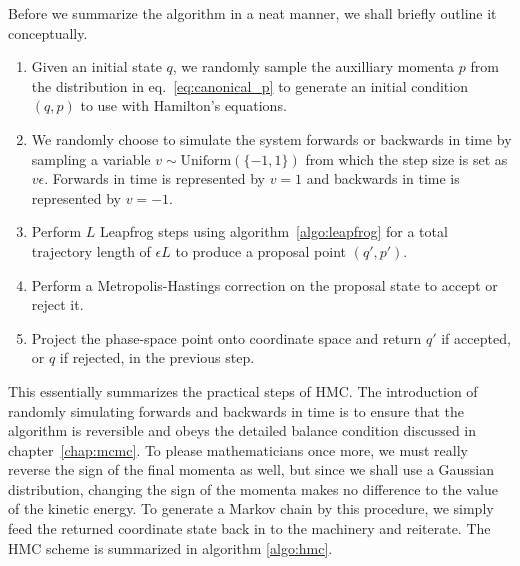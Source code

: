 Before we summarize the algorithm in a neat manner, we shall briefly outline it conceptually. 
\begin{enumerate}
  \item Given an initial state $q$, we randomly sample the auxilliary momenta $p$ from the distribution in eq.~\eqref{eq:canonical_p}
  to generate an initial condition $(q, p)$ to use with Hamilton's equations.
  \item We randomly choose to simulate the system forwards or backwards in time by sampling a variable $v \sim \text{Uniform}(\{-1, 1\})$
  from which the step size is set as $v\epsilon$. Forwards in time is represented by $v = 1$ and backwards in time is represented by $v = -1$. 
  \item Perform $L$ Leapfrog steps using algorithm~\ref{algo:leapfrog} for a total trajectory length of $\epsilon L$ to produce
  a proposal point $(q', p')$.
  \item Perform a Metropolis-Hastings correction on the proposal state to accept or reject it.
  \item Project the phase-space point onto coordinate space and return $q'$ if accepted, or $q$ if rejected, in the previous step.
\end{enumerate}
This essentially summarizes the practical steps of HMC. The introduction of randomly simulating
forwards and backwards in time is to ensure that the algorithm is reversible and obeys the detailed balance condition discussed in chapter~\ref{chap:mcmc}.
To please mathematicians once more, we must really reverse the sign of the final momenta as well, but since we shall use a Gaussian distribution, changing the sign
of the momenta makes no difference to the value of the kinetic energy. 
To generate a Markov chain by this procedure, we simply feed the returned coordinate state back in to the machinery 
and reiterate.
The HMC scheme is summarized in algorithm \ref{algo:hmc}.
